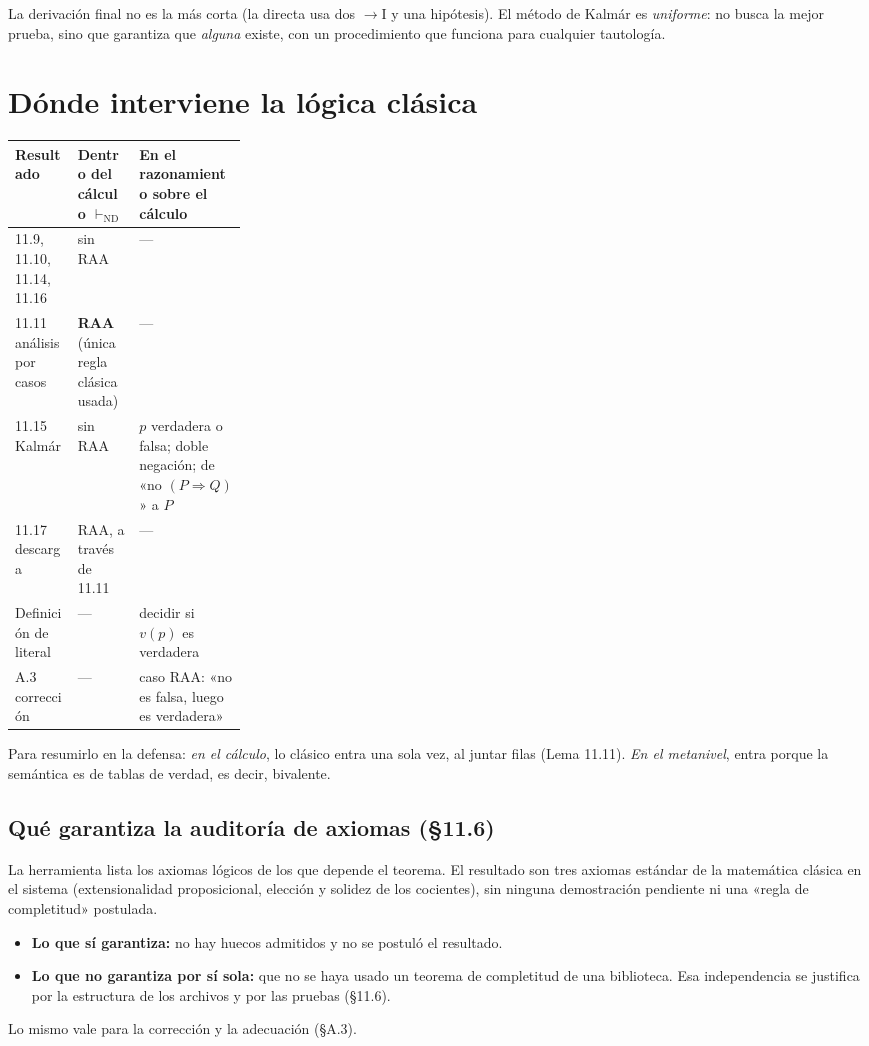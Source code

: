 \documentclass[11pt,a4paper]{article}
\newcommand{\Provnd}{\vdash_{\mathrm{ND}}}
\newcommand{\Imp}{\rightarrow}
\begin{document}
\begin{nota}
La derivación final no es la más corta (la directa usa dos \(\Imp\)I y una
hipótesis). El método de Kalmár es \emph{uniforme}: no busca la mejor prueba,
sino que garantiza que \emph{alguna} existe, con un procedimiento que funciona
para cualquier tautología.
\end{nota}

\section{Dónde interviene la lógica clásica}

\begin{center}
\renewcommand{\arraystretch}{1.35}
{\small
\begin{tabularx}{\linewidth}{@{}p{0.27\linewidth}XX@{}}
\toprule
\textbf{Resultado} & \textbf{Dentro del cálculo \(\Provnd\)} & \textbf{En el razonamiento sobre el cálculo}\\
\midrule
11.9, 11.10, 11.14, 11.16 & sin RAA & ---\\
11.11 análisis por casos & \textbf{RAA} (única regla clásica usada) & ---\\
11.15 Kalmár & sin RAA & \(p\) verdadera o falsa; doble negación; de «no \((P\Rightarrow Q)\)» a \(P\)\\
11.17 descarga & RAA, a través de 11.11 & ---\\
Definición de literal & --- & decidir si \(v(p)\) es verdadera\\
A.3 corrección & --- & caso RAA: «no es falsa, luego es verdadera»\\
\bottomrule
\end{tabularx}}
\end{center}

Para resumirlo en la defensa: \emph{en el cálculo}, lo clásico entra una sola
vez, al juntar filas (Lema 11.11). \emph{En el metanivel}, entra porque la
semántica es de tablas de verdad, es decir, bivalente.

\subsection*{Qué garantiza la auditoría de axiomas (§11.6)}

La herramienta lista los axiomas lógicos de los que depende el teorema. El
resultado son tres axiomas estándar de la matemática clásica en el sistema
(extensionalidad proposicional, elección y solidez de los cocientes), sin
ninguna demostración pendiente ni una «regla de completitud» postulada.
\begin{itemize}
  \item \textbf{Lo que sí garantiza:} no hay huecos admitidos y no se postuló
    el resultado.
  \item \textbf{Lo que no garantiza por sí sola:} que no se haya usado un
    teorema de completitud de una biblioteca. Esa independencia se justifica
    por la estructura de los archivos y por las pruebas (§11.6).
\end{itemize}
Lo mismo vale para la corrección y la adecuación (§A.3).
\end{document}
